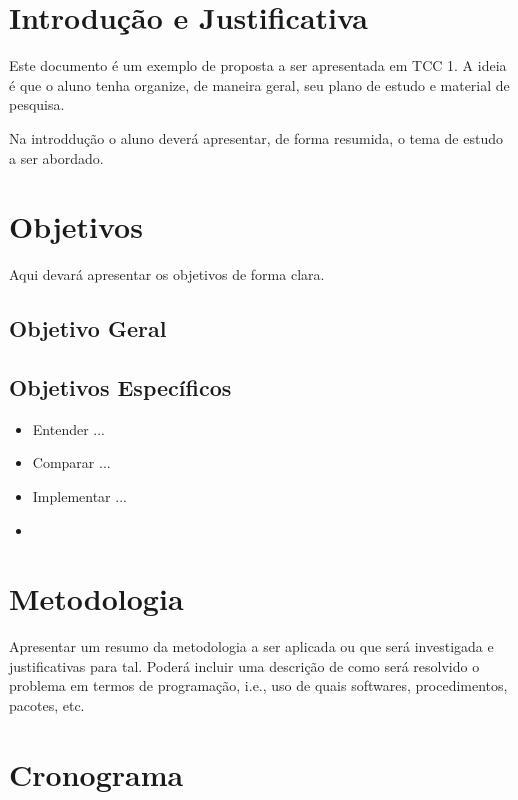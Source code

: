 

\section*{Introdução e Justificativa}

Este documento é um exemplo de proposta a ser apresentada em TCC 1. A ideia é que o aluno
tenha organize, de maneira geral, seu plano de estudo e material de pesquisa.

Na introddução o aluno deverá apresentar, de forma resumida, o tema de estudo a ser abordado.

\lipsum[1]

\section*{Objetivos}

Aqui devará apresentar os objetivos de forma clara.

\subsection*{Objetivo Geral}

\lipsum[1]

\subsection*{Objetivos Específicos}

\begin{itemize}
	\item Entender ...
	\item Comparar ...
	\item Implementar ...
	\item \lipsum[1]
\end{itemize}

\section*{Metodologia}

Apresentar um resumo da metodologia a ser aplicada ou que será investigada e justificativas
para tal. Poderá incluir uma descrição de como será resolvido o problema em termos de programação, i.e.,
uso de quais softwares, procedimentos, pacotes, etc.

\lipsum[1]

\section*{Cronograma}

